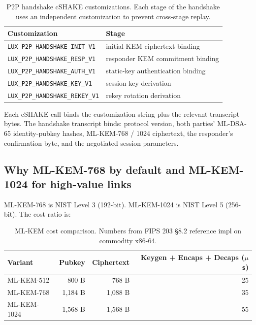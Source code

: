 \begin{table}[H]
\centering
\caption{P2P handshake cSHAKE customizations. Each stage of the handshake
uses an independent customization to prevent cross-stage replay.}
\label{tab:p2p-cust}
\begin{tabular}{lp{7cm}}
\toprule
Customization & Stage \\
\midrule
\texttt{LUX\_P2P\_HANDSHAKE\_INIT\_V1}   & initial KEM ciphertext binding \\
\texttt{LUX\_P2P\_HANDSHAKE\_RESP\_V1}   & responder KEM commitment binding \\
\texttt{LUX\_P2P\_HANDSHAKE\_AUTH\_V1}   & static-key authentication binding \\
\texttt{LUX\_P2P\_HANDSHAKE\_KEY\_V1}    & session key derivation \\
\texttt{LUX\_P2P\_HANDSHAKE\_REKEY\_V1}  & rekey rotation derivation \\
\bottomrule
\end{tabular}
\end{table}

Each cSHAKE call binds the customization string plus the relevant
transcript bytes. The handshake transcript binds: protocol version, both
parties' ML-DSA-65 identity-pubkey hashes, ML-KEM-768 / 1024 ciphertext,
the responder's confirmation byte, and the negotiated session parameters.

\subsection{Why ML-KEM-768 by default and ML-KEM-1024 for high-value links}

ML-KEM-768 is NIST Level 3 (192-bit). ML-KEM-1024 is NIST Level 5
(256-bit). The cost ratio is:

\begin{table}[H]
\centering
\caption{ML-KEM cost comparison. Numbers from FIPS 203 §8.2 reference impl
on commodity x86-64.}
\label{tab:mlkem-cost}
\begin{tabular}{lrrr}
\toprule
Variant & Pubkey & Ciphertext & Keygen + Encaps + Decaps (\texttt{$\mu$s}) \\
\midrule
ML-KEM-512   & 800 B    & 768 B    & 25 \\
ML-KEM-768   & 1{,}184 B & 1{,}088 B & 35 \\
ML-KEM-1024  & 1{,}568 B & 1{,}568 B & 55 \\
\bottomrule
\end{tabular}
\end{table}

